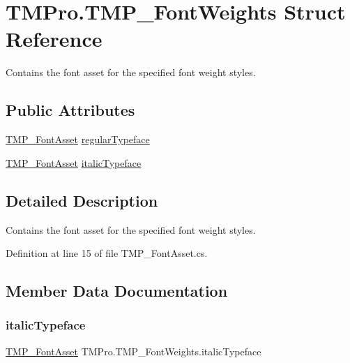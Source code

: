 \hypertarget{struct_t_m_pro_1_1_t_m_p___font_weights}{}\section{T\+M\+Pro.\+T\+M\+P\+\_\+\+Font\+Weights Struct Reference}
\label{struct_t_m_pro_1_1_t_m_p___font_weights}


Contains the font asset for the specified font weight styles.  


\subsection*{Public Attributes}
\begin{DoxyCompactItemize}
\item 
\mbox{\hyperlink{class_t_m_pro_1_1_t_m_p___font_asset}{T\+M\+P\+\_\+\+Font\+Asset}} \mbox{\hyperlink{struct_t_m_pro_1_1_t_m_p___font_weights_a326cf47ef4e92236a30c074002999d52}{regular\+Typeface}}
\item 
\mbox{\hyperlink{class_t_m_pro_1_1_t_m_p___font_asset}{T\+M\+P\+\_\+\+Font\+Asset}} \mbox{\hyperlink{struct_t_m_pro_1_1_t_m_p___font_weights_a3fa9248eaf31a209a488d68d1427848d}{italic\+Typeface}}
\end{DoxyCompactItemize}


\subsection{Detailed Description}
Contains the font asset for the specified font weight styles. 



Definition at line 15 of file T\+M\+P\+\_\+\+Font\+Asset.\+cs.



\subsection{Member Data Documentation}
\mbox{\label{struct_t_m_pro_1_1_t_m_p___font_weights_a3fa9248eaf31a209a488d68d1427848d}} 
\subsubsection{\texorpdfstring{italicTypeface}{italicTypeface}}
{\footnotesize\ttfamily \mbox{\hyperlink{class_t_m_pro_1_1_t_m_p___font_asset}{T\+M\+P\+\_\+\+Font\+Asset}} T\+M\+Pro.\+T\+M\+P\+\_\+\+Font\+Weights.\+italic\+Typeface}



